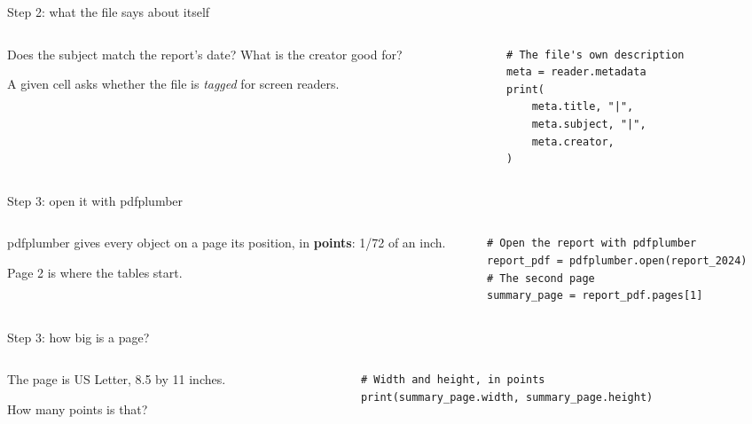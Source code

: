 \documentclass[9pt,aspectratio=169]{beamer}
\begin{document}
\begin{frame}[fragile]{Step 2: what the file says about itself}
    \begin{columns}[T]
        \begin{column}{0.37\textwidth}
            Does the subject match the report's date? What is the creator good for?

            \medskip
            A given cell asks whether the file is \textit{tagged} for screen readers.
        \end{column}
        \begin{column}{0.6\textwidth}
\begin{lstlisting}
# The file's own description
meta = reader.metadata
print(
    meta.title, "|",
    meta.subject, "|",
    meta.creator,
)
\end{lstlisting}
        \end{column}
    \end{columns}
\end{frame}

\begin{frame}[fragile]{Step 3: open it with pdfplumber}
    \begin{columns}[T]
        \begin{column}{0.37\textwidth}
            pdfplumber gives every object on a page its position, in \textbf{points}: 1/72 of an inch.

            \medskip
            Page 2 is where the tables start.
        \end{column}
        \begin{column}{0.6\textwidth}
\begin{lstlisting}
# Open the report with pdfplumber
report_pdf = pdfplumber.open(report_2024)
# The second page
summary_page = report_pdf.pages[1]
\end{lstlisting}
        \end{column}
    \end{columns}
\end{frame}

\begin{frame}[fragile]{Step 3: how big is a page?}
    \begin{columns}[T]
        \begin{column}{0.37\textwidth}
            The page is US Letter, 8.5 by 11 inches.

            \medskip
            How many points is that?
        \end{column}
        \begin{column}{0.6\textwidth}
\begin{lstlisting}
# Width and height, in points
print(summary_page.width, summary_page.height)
\end{lstlisting}
        \end{column}
    \end{columns}
\end{frame}
\end{document}
